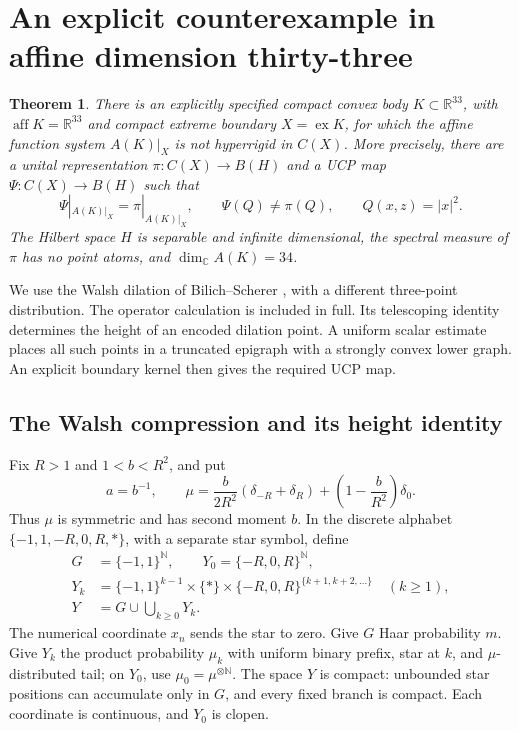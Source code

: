 \documentclass[11pt,letterpaper]{amsart}
\newtheorem{theorem}{Theorem}[section]
\theoremstyle{definition}
\theoremstyle{remark}
\numberwithin{equation}{section}
\DeclareMathOperator{\ex}{ex}
\DeclareMathOperator{\aff}{aff}
\begin{document}
\section{An explicit counterexample in affine dimension thirty-three}
\label{sec:construction}

\begin{theorem}\label{thm:main}
There is an explicitly specified compact convex body
\(K\subset\mathbb R^{33}\), with \(\aff K=\mathbb R^{33}\) and
compact extreme boundary \(X=\ex K\), for which the affine function
system \(A(K)|_X\) is not hyperrigid in \(C(X)\).
More precisely, there are a unital representation
\(\pi:C(X)\to B(H)\) and a UCP map \(\Psi:C(X)\to B(H)\) such that
\[
 \Psi|_{A(K)|_X}=\pi|_{A(K)|_X},\qquad \Psi(Q)\ne\pi(Q),
 \qquad Q(x,z)=|x|^2.
\]
The Hilbert space \(H\) is separable and infinite dimensional,
the spectral measure of \(\pi\) has no point atoms, and
\(\dim_{\mathbb C}A(K)=34\).
\end{theorem}

We use the Walsh dilation of Bilich--Scherer \cite[Section 3]{BS},
with a different three-point distribution. The operator calculation
is included in full. Its telescoping identity determines the height
of an encoded dilation point. A uniform scalar estimate places all
such points in a truncated epigraph with a strongly convex lower graph. An explicit
boundary kernel then gives the required UCP map.

\subsection{The Walsh compression and its height identity}

Fix \(R>1\) and \(1<b<R^2\), and put
\[
 a=b^{-1},\qquad
 \mu=\frac{b}{2R^2}(\delta_{-R}+\delta_R)
                  +\left(1-\frac b{R^2}\right)\delta_0.
\]
Thus \(\mu\) is symmetric and has second moment \(b\).
In the discrete alphabet \(\{-1,1,-R,0,R,*\}\), with a separate
star symbol, define
\[
 \begin{split}
 G&=\{-1,1\}^{\mathbb N},\qquad Y_0=\{-R,0,R\}^{\mathbb N},\\
 Y_k&=\{-1,1\}^{k-1}\times\{*\}\times
        \{-R,0,R\}^{\{k+1,k+2,\ldots\}}\quad(k\ge1),\\
 Y&=G\cup\bigcup_{k\ge0}Y_k.
 \end{split}
\]
The numerical coordinate \(x_n\) sends the star to zero.
Give \(G\) Haar probability \(m\). Give \(Y_k\) the product
probability \(\mu_k\) with uniform binary prefix, star at \(k\),
and \(\mu\)-distributed tail; on \(Y_0\), use
\(\mu_0=\mu^{\otimes\mathbb N}\).
The space \(Y\) is compact: unbounded star positions can accumulate
only in \(G\), and every fixed branch is compact.
Each coordinate is continuous, and \(Y_0\) is clopen.
\end{document}
